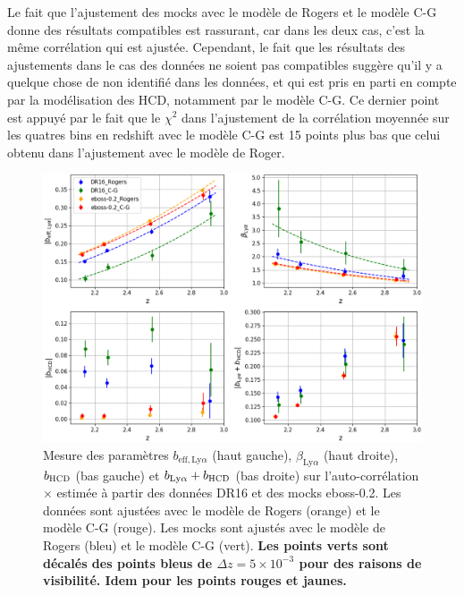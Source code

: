 \documentclass[11pt, twoside, a4paper, openright]{report}
\begin{document}
Le fait que l'ajustement des mocks avec le modèle de Rogers et le modèle C-G donne des résultats compatibles est rassurant, car dans les deux cas, c'est la même corrélation qui est ajustée. Cependant, le fait que les résultats des ajustements dans le cas des données ne soient pas compatibles suggère qu'il y a quelque chose de non identifié dans les données, et qui est pris en parti en compte par la modélisation des HCD, notamment par le modèle C-G. Ce dernier point est appuyé par le fait que le $\chi^2$ dans l'ajustement de la corrélation moyennée sur les quatres bins en redshift avec le modèle C-G est 15 points plus bas que celui obtenu dans l'ajustement avec le modèle de Roger.

\begin{figure}
  \centering
  \includegraphics[scale=0.44]{bias_CG_mask}
  \caption{Mesure des paramètres $b_{\mathrm{eff},\mathrm{Ly}\alpha}$ (haut gauche), $\beta_{\mathrm{Ly}\alpha}$ (haut droite), $b_{\textsc{HCD}}$ (bas gauche) et $b_{\mathrm{Ly}\alpha} + b_{\textsc{HCD}}$ (bas droite) sur l'auto-corrélation \lya$\times$\lya{} estimée à partir des données DR16 et des mocks eboss-0.2. Les données sont ajustées avec le modèle de Rogers (orange) et le modèle C-G (rouge). Les mocks sont ajustés avec le modèle de Rogers (bleu) et le modèle C-G (vert). \textbf{Les points verts sont décalés des points bleus de $\Delta z = 5\times10^{-3}$ pour des raisons de visibilité. Idem pour les points rouges et jaunes.}}
  \label{fig:bias_CG_mask}
\end{figure}
\end{document}
